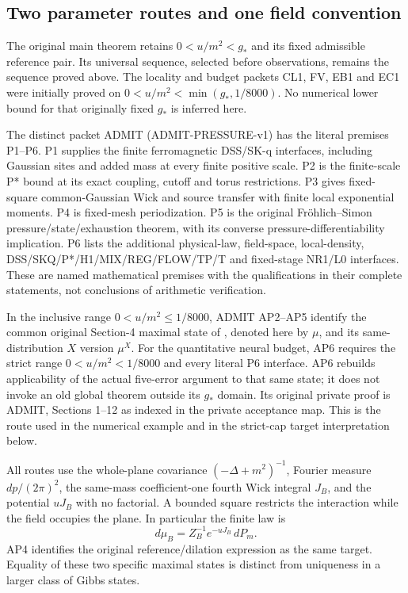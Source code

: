 \documentclass[11pt]{article}
\theoremstyle{plain}
\theoremstyle{definition}
\theoremstyle{remark}
\begin{document}
\subsection{Two parameter routes and one field convention}
\label{qrs:routes}

The original main theorem retains $0<u/m^2<g_*$ and its fixed admissible
reference pair. Its universal sequence, selected before observations, remains
the sequence proved above. The locality and budget packets CL1, FV, EB1 and
EC1 were initially proved on
$0<u/m^2<\min(g_*,1/8000)$. No numerical lower bound for that originally
fixed $g_*$ is inferred here.

The distinct packet ADMIT (ADMIT-PRESSURE-v1) has the literal premises
P1--P6. P1 supplies the finite ferromagnetic DSS/SK-q interfaces, including
Gaussian sites and added mass at every finite positive scale. P2 is the
finite-scale P* bound at its exact coupling, cutoff and torus restrictions.
P3 gives fixed-square common-Gaussian Wick and source transfer with finite
local exponential moments. P4 is fixed-mesh periodization. P5 is the original
Fr\"ohlich--Simon pressure/state/exhaustion theorem, with its converse
pressure-differentiability implication. P6 lists the additional physical-law,
field-space, local-density, DSS/SKQ/P*/H1/MIX/REG/FLOW/TP/T and fixed-stage
NR1/L0 interfaces. These are named mathematical premises with the
qualifications in their complete statements, not conclusions of arithmetic
verification.

In the inclusive range $0<u/m^2\le1/8000$, ADMIT AP2--AP5 identify the
common original Section-4 maximal state of \cite{FS1977}, denoted here by
$\mu$, and its same-distribution $X$ version $\mu^X$. For the quantitative
neural budget, AP6 requires the strict range
$0<u/m^2<1/8000$ and every literal P6 interface. AP6 rebuilds applicability
of the actual five-error argument to that same state; it does not invoke an
old global theorem outside its $g_*$ domain. Its original private proof is ADMIT, Sections
1--12 as indexed in the private acceptance map. This is the route used in the numerical
example and in the strict-cap target interpretation below.

All routes use the whole-plane covariance $(-\Delta+m^2)^{-1}$, Fourier
measure $dp/(2\pi)^2$, the same-mass coefficient-one fourth Wick integral
$J_B$, and the potential $uJ_B$ with no factorial. A bounded square restricts
the interaction while the field occupies the plane. In particular the finite
law is
\begin{equation}\label{qrs:finite-law}
 d\mu_B=Z_B^{-1}e^{-uJ_B}\,dP_m.
\end{equation}
AP4 identifies the original reference/dilation expression as the same
target. Equality of these two specific maximal states is distinct from
uniqueness in a larger class of Gibbs states.
\end{document}
